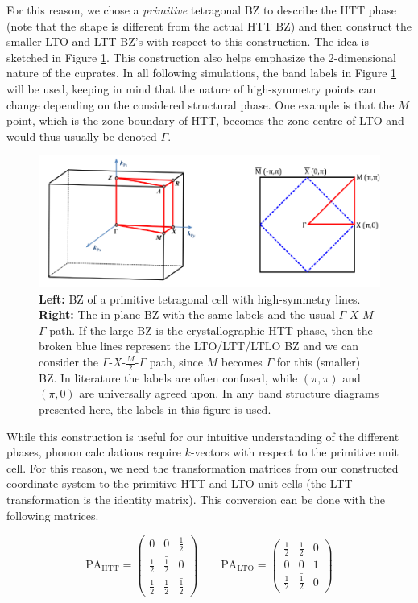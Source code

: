For this reason, we chose a \emph{primitive} tetragonal BZ to describe the HTT phase (note that the shape is different from the actual HTT BZ) and then construct the smaller LTO and LTT BZ's with respect to this construction. The idea is sketched in Figure \ref{fig:band_paths}. This construction also helps emphasize the 2-dimensional nature of the cuprates. In all following simulations, the band labels in Figure \ref{fig:band_paths} will be used, keeping in mind that the nature of high-symmetry points can change depending on the considered structural phase. One example is that the $M$ point, which is the zone boundary of HTT, becomes the zone centre of LTO and would thus usually be denoted $\Gamma$.

\begin{figure}
    \centering
    \includegraphics[width=\textwidth]{fig/simulation/band_paths.pdf}
    \caption[Band paths]{\textbf{Left:} BZ of a primitive tetragonal cell with high-symmetry lines. \textbf{Right:} The in-plane BZ with the same labels and the usual $\Gamma$-$X$-$M$-$\Gamma$ path. If the large BZ is the crystallographic HTT phase, then the broken blue lines represent the LTO/LTT/LTLO BZ and we can consider the $\Gamma$-$X$-$\frac{M}{2}$-$\Gamma$ path, since $M$ becomes $\Gamma$ for this (smaller) BZ. In literature the labels are often confused, while $(\pi,\pi)$ and $(\pi,0)$ are universally agreed upon. In any band structure diagrams presented here, the labels in this figure is used.} 
    \label{fig:band_paths}
\end{figure}

While this construction is useful for our intuitive understanding of the different phases, phonon calculations require $k$-vectors with respect to the primitive unit cell. For this reason, we need the transformation matrices from our constructed coordinate system to the primitive HTT and LTO unit cells (the LTT transformation is the identity matrix). This conversion can be done with the following matrices.

\[
\text{PA}_\text{HTT} =  
\begin{pmatrix}
0 & 0 & \frac{1}{2} \\
\frac{1}{2} & \bar{\frac{1}{2}} & 0 \\
\frac{1}{2} & \frac{1}{2} & \bar{\frac{1}{2}}
\end{pmatrix}
\qquad
\text{PA}_\text{LTO} =  
\begin{pmatrix}
\frac{1}{2} & \frac{1}{2} & 0 \\
0 & 0 & 1 \\
\frac{1}{2} & \bar{\frac{1}{2}} & 0
\end{pmatrix}
\]

